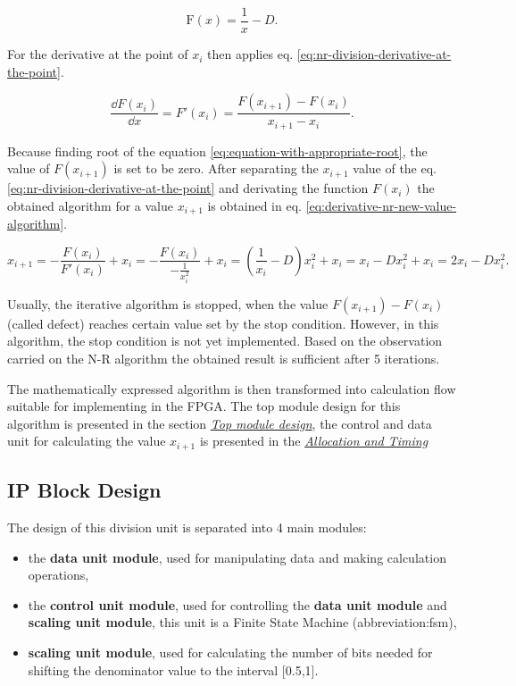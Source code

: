 \documentclass[a4paper, twoside, 11pt]{article}
\begin{document}
\begin{equation}\label{eq:equation-with-appropriate-root}
  \text{F} (x) = \frac{1}{x} - D.
\end{equation}

For the derivative at the point of $x_i$ then applies eq. \ref{eq:nr-division-derivative-at-the-point}.

\begin{equation}\label{eq:nr-division-derivative-at-the-point}
  \frac{\dd F(x_i)}{\dd x} = F'(x_i) = \frac{F (x_{i+1}) - F (x_i)}{x_{i+1}-x_i}.
\end{equation}

Because finding root of the equation \ref{eq:equation-with-appropriate-root}, the value of $F (x_{i+1})$ is set to be zero. After separating the $x_{i+1}$ value of the eq. \ref{eq:nr-division-derivative-at-the-point} and derivating the function $F (x_i)$ the obtained algorithm for a value $x_{i+1}$ is obtained in eq. \ref{eq:derivative-nr-new-value-algorithm}.\par

\begin{equation}\label{eq:derivative-nr-new-value-algorithm}
  x_{i+1} = -\frac{F (x_i)}{F' (x_i)} + x_i = - \frac{F (x_i)}{-\frac{1}{x_i^2}} + x_i = (\frac{1}{x_i} - D) x_i^2 + x_i = x_i - D x_i^2 + x_i = 2 x_i - D x_i^2.
\end{equation}

Usually, the iterative algorithm is stopped, when the value $F(x_{i+1}) - F(x_i)$ (called defect) reaches certain value set by the stop condition. However, in this algorithm, the stop condition is not yet implemented. Based on the observation carried on the N-R algorithm the obtained result is sufficient after 5 iterations.

The mathematically expressed algorithm is then transformed into calculation flow suitable for implementing in the FPGA. The top module design for this algorithm is presented in the section \hyperref[subsubsec:division-top-module-design]{\textit{Top module design}}, the control and data unit for calculating the value $x_{i+1}$ is presented in the \hyperref[subsubsec:division-allocation-and-timing]{\textit{Allocation and Timing}}

\subsection{IP Block Design}\label{subsec:division-ip-block-design}
The design of this division unit is separated into 4 main modules:
\begin{itemize}
  \item the \textbf{data unit module}, used for manipulating data and making calculation operations,
  \item the \textbf{control unit module}, used for controlling the \textbf{data unit module} and \textbf{scaling unit module}, this unit is a Finite State Machine (\gls{abbreviation:fsm}),
  \item \textbf{scaling unit module}, used for calculating the number of bits needed for shifting the denominator value to the interval [0.5,1].
\end{itemize}
\end{document}
